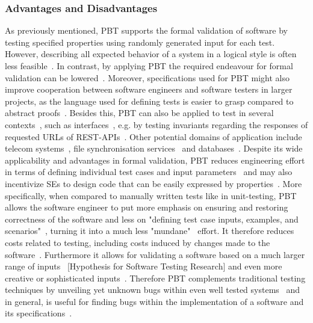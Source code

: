 \documentclass[runningheads]{llncs}
\begin{document}
\subsubsection{Advantages and Disadvantages}
As previously mentioned, PBT supports the formal validation of software by testing specified properties using randomly generated input for each test. However, describing all expected behavior of a system in a logical style is often less feasible~\cite{Chen2022,Koopman2012}. In contrast, by applying PBT the required endeavour for formal validation can be lowered~\cite{Hritcu2016,Chen2022,Paraskevopoulou2015}. Moreover, specifications used for PBT might also improve cooperation between software engineers and software testers in larger projects, as the language used for defining tests is easier to grasp compared to abstract proofs~\cite{Chen2022,Loescher2017}. Besides this, PBT can also be applied to test in several contexts~\cite{Karlsson2019}, such as interfaces~\cite{Karlsson2019,Francisco2013,LamelaSeijas2013}, e.g. by testing invariants regarding the responses of requested URLs of REST-APIs~\cite{Karlsson2019}. Other potential domains of application include telecom systems~\cite{Arts2006}, file synchronisation services~\cite{Hughes2016} and databases~\cite{Arts2015}. Despite its wide applicability and advantages in formal validation, PBT reduces engineering effort in terms of defining individual test cases and input parameters~\cite{Chen2022,Loescher2017,Corgozinho2023} and may also incentivize SEs to design code that can be easily expressed by properties~\cite{Chen2022}. More specifically, when compared to manually written tests like in unit-testing, PBT allows the software engineer to put more emphasis on ensuring and restoring correctness of the software and less on "defining test case inputs, examples, and scenarios"~\cite{Corgozinho2023}, turning it into a much less "mundane"~\cite{Loescher2017} effort. It therefore reduces costs related to testing, including costs induced by changes made to the software~\cite{Chen2022,Loescher2017}. Furthermore it allows for validating a software based on a much larger range of inputs~\cite{Loescher2017} [Hypothesis for Software Testing Research] and even more creative or sophisticated inputs~\cite{Arts2015}. Therefore PBT complements traditional testing techniques by unveiling yet unknown bugs within even well tested systems~\cite{Arts2015,Hughes2016,Arts2006} and in general, is useful for finding bugs within the implementation of a software and its specifications~\cite{Chen2022,Fink1997,Loescher2017,Paraskevopoulou2015,Claessen2000,Corgozinho2023}.
\end{document}
